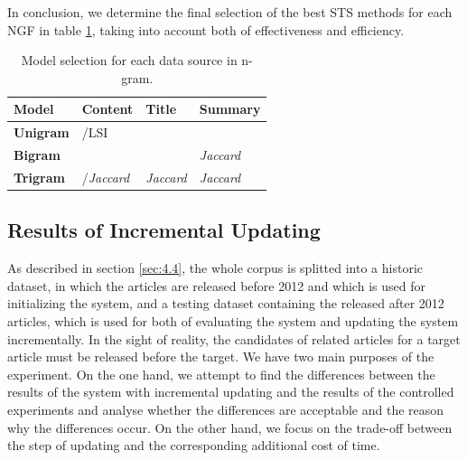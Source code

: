 In conclusion, we determine the final selection of the best STS methods for each NGF in table \ref{tab:select}, taking into account both of effectiveness and efficiency.

\begin{table}[!htb]
\centering
\begin{tabularx}{0.8\textwidth}{|X|X|X|X|}
\hline
\textbf{Model} & \textbf{Content} & \textbf{Title} & \textbf{Summary} \\ \hline
\textbf{Unigram} & \tfidf{}/LSI & \tfidf{} & \tfidf{} \\ \hline
\textbf{Bigram} & \tfidf{} & \tfidf{} & \textit{Jaccard} \\ \hline
\textbf{Trigram} & \tfidf{}/\textit{Jaccard} & \textit{Jaccard} & \textit{Jaccard} \\ \hline
\end{tabularx}
\caption{Model selection for each data source in n-gram.}
\label{tab:select}
\end{table}

\subsection{Results of Incremental Updating}
\label{sec:5.4}

As described in section \ref{sec:4.4}, the whole corpus is splitted into a historic dataset, in which the articles are released before 2012 and which is used for initializing the system, and a testing dataset containing the released after 2012 articles, which is used for both of evaluating the system and updating the system incrementally. In the sight of reality, the candidates of related articles for a target article must be released before the target. We have two main purposes of the experiment. On the one hand, we attempt to find the differences between the results of the system with incremental updating and the results of the controlled experiments and analyse whether the differences are acceptable and the reason why the differences occur. On the other hand, we focus on the trade-off between the step of updating and the corresponding additional cost of time. 

